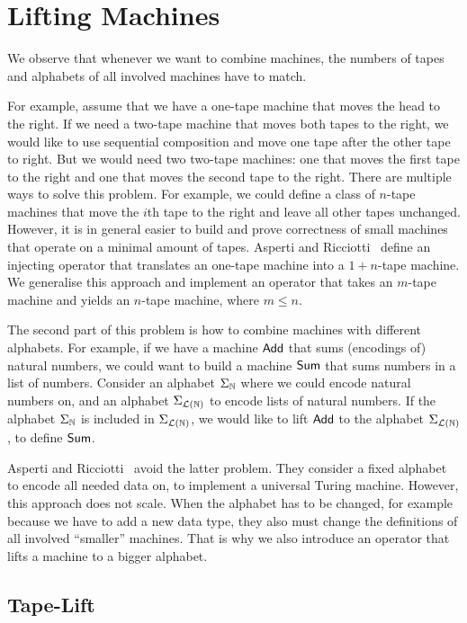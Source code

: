 \chapter{Lifting Machines}
\label{chap:lifting}

We observe that whenever we want to combine machines, the numbers of tapes and alphabets of all involved machines have to match.

For example, assume that we have a one-tape machine that moves the head to the right.  If we need a two-tape machine that moves both tapes to the
right, we would like to use sequential composition and move one tape after the other tape to right.  But we would need two two-tape machines: one that
moves the first tape to the right and one that moves the second tape to the right.  There are multiple ways to solve this problem.  For example, we
could define a class of $n$-tape machines that move the $i$th tape to the right and leave all other tapes unchanged.  However, it is in general easier
to build and prove correctness of small machines that operate on a minimal amount of tapes.  Asperti and Ricciotti~\cite{asperti2015} define an
injecting operator that translates an one-tape machine into a $1+n$-tape machine.  We generalise this approach and implement an operator that takes an
$m$-tape machine and yields an $n$-tape machine, where $m \le n$.

The second part of this problem is how to combine machines with different alphabets.  For example, if we have a machine $\mathsf{Add}$ that sums
(encodings of) natural numbers, we could want to build a machine $\mathsf{Sum}$ that sums numbers in a list of numbers.  Consider an alphabet
$\Sigma_{\mathbb{N}}$ where we could encode natural numbers on, and an alphabet $\Sigma_{\mathcal{L}(\mathbb{N})}$ to encode lists of natural numbers.  If the alphabet
$\Sigma_{\mathbb{N}}$ is included in $\Sigma_{\mathcal{L}(\mathbb{N})}$, we would like to lift $\mathsf{Add}$ to the alphabet $\Sigma_{\mathcal{L}(\mathbb{N})}$, to define $\mathsf{Sum}$.

Asperti and Ricciotti~\cite{asperti2015} avoid the latter problem.  They consider a fixed alphabet to encode all needed data on, to implement a
universal Turing machine.  However, this approach does not scale.  When the alphabet has to be changed, for example because we have to add a new data
type, they also must change the definitions of all involved ``smaller'' machines.  That is why we also introduce an operator that lifts a machine to a
bigger alphabet.


\section{Tape-Lift}
\label{sec:n-Lift}

